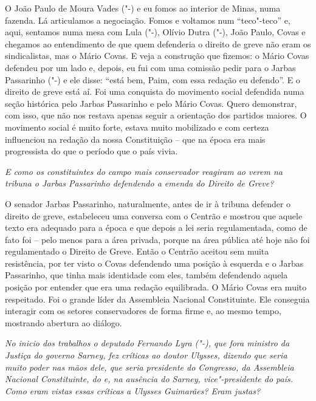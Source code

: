 O João Paulo de Moura Vades ("-) e eu fomos ao interior de Minas,
numa fazenda. Lá articulamos a negociação. Fomos e voltamos num
``teco"-teco'' e, aqui, sentamos numa mesa com Lula ("-), Olívio
Dutra ("-), João Paulo,
Covas e chegamos ao entendimento de
que quem defenderia o direito de greve não eram os sindicalistas, mas o
Mário Covas. E veja a construção que fizemos: o Mário Covas defendeu por
um lado e, depois, eu fui com uma comissão pedir para o Jarbas
Passarinho ("-) e ele disse: ``está bem, Paim, com essa redação eu
defendo''. E o direito de greve está aí. Foi uma conquista do movimento
social defendida numa seção histórica pelo Jarbas Passarinho e pelo
Mário Covas. Quero demonstrar, com isso, que não nos restava apenas
seguir a orientação dos partidos maiores. O movimento social é muito
forte, estava muito mobilizado e com certeza influenciou na redação da
nossa Constituição -- que na época era mais progressista do que o
período que o país vivia.

\medskip

\noindent\emph{E como os constituintes do campo mais conservador reagiram ao
verem na tribuna o Jarbas Passarinho defendendo a emenda do Direito de
Greve?}

O senador Jarbas Passarinho, naturalmente, antes de ir à
tribuna defender o direito de greve, estabeleceu uma conversa com o
Centrão e mostrou que aquele texto era adequado para a época e que
depois a lei seria regulamentada, como de fato foi -- pelo menos para a
área privada, porque na área pública até hoje não foi regulamentado o
Direito de Greve. Então o Centrão aceitou sem muita resistência, por ter
visto o Covas defendendo uma posição à esquerda e o Jarbas Passarinho,
que tinha mais identidade com eles, também defendendo aquela posição por
entender que era uma redação equilibrada. O Mário Covas era muito
respeitado. Foi o grande líder da Assembleia Nacional Constituinte. Ele
conseguia interagir com os setores conservadores de forma firme e, ao
mesmo tempo, mostrando abertura ao diálogo.

\medskip

\noindent\emph{No inicio dos trabalhos o deputado Fernando Lyra ("-), que
fora ministro da Justiça do governo Sarney, fez críticas ao doutor
Ulysses, dizendo que seria muito poder nas mãos dele, que seria
presidente do Congresso, da Assembleia Nacional Constituinte, do  e,
na ausência do Sarney, vice"-presidente do país. Como eram vistas essas
críticas a Ulysses Guimarães? Eram justas?}

